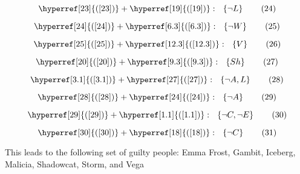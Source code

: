 \documentclass[a4paper]{article}
\newcommand{\refequation}[1]{\hyperref[#1]{(\ref{#1})}}
\begin{document}
\begin{equation}
\refequation{23} + \refequation{19}: \  \ \left\{ \lnot L \right\} \tag{24} \label{24}
\end{equation}

\begin{equation}
\refequation{24} + \refequation{6.3}: \  \ \left\{ \lnot W \right\} \tag{25} \label{25}
\end{equation}

\begin{equation}
\refequation{25} + \refequation{12.3}: \  \ \left\{ V \right\} \tag{26} \label{26}
\end{equation}

\begin{equation}
\refequation{20} + \refequation{9.3}: \  \ \left\{ Sh \right\} \tag{27} \label{27}
\end{equation}

\begin{equation}
\refequation{3.1} + \refequation{27}: \  \ \left\{ \lnot A , L \right\} \tag{28} \label{28}
\end{equation}

\begin{equation}
\refequation{28} + \refequation{24}: \  \ \left\{ \lnot A \right\} \tag{29} \label{29}
\end{equation}

\begin{equation}
\refequation{29} + \refequation{1.1}: \  \ \left\{ \lnot C, \lnot E \right\} \tag{30} \label{30}
\end{equation}

\begin{equation}
\refequation{30} + \refequation{18}: \  \ \left\{ \lnot C \right\} \tag{31} \label{31}
\end{equation}

This leads to the following set of guilty people: Emma Frost, Gambit, Iceberg, Malicia, Shadowcat, Storm, and Vega
\end{document}
